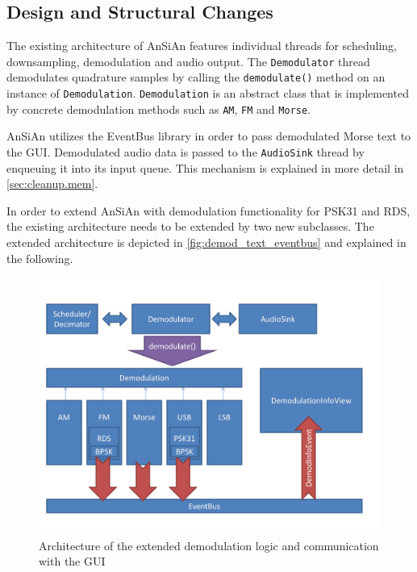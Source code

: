 \subsection{Design and Structural Changes\label{sec:demod_design}}

The existing architecture of \ac{AnSiAn} features individual threads for scheduling, 
downsampling, demodulation and audio output. The \texttt{De\-mo\-du\-la\-tor} thread demodulates 
quadrature samples by calling the \texttt{demodulate()} method on an instance of
\texttt{Demodulation}. \texttt{Demodulation} is an abstract class that is implemented by concrete 
demodulation methods such as \texttt{AM}, \texttt{FM} and \texttt{Morse}. 

\ac{AnSiAn} utilizes the EventBus library in order to pass demodulated Morse text
to the \ac{GUI}. Demodulated audio data is passed to the
\texttt{AudioSink} thread by enqueuing it into its input queue.
This mechanism is explained in more detail in \autoref{sec:cleanup.mem}.


In order to extend \ac{AnSiAn} with demodulation functionality for \ac{PSK31} and \ac{RDS}, 
the existing architecture needs to be extended by two new subclasses. The extended architecture is
depicted in \autoref{fig:demod_text_eventbus} and explained in the following.

\begin{figure}
	\centering
	\includegraphics[width=1\linewidth]{gfx/demod_text_eventbus.png}
	\caption{Architecture of the extended demodulation logic and communication with the GUI}
	\label{fig:demod_text_eventbus}
\end{figure}

